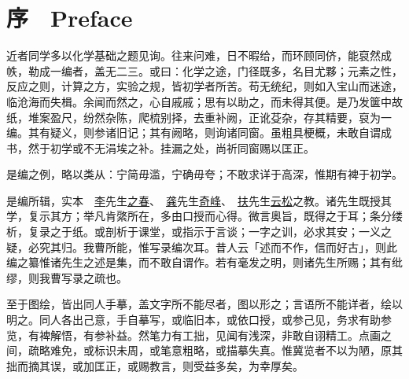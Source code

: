 
\chapter*{序　Preface}

\begingroup
    \renewcommand{\numberline}[1]{}   %
\endgroup

\thispagestyle{plain}   %

近者同学多以化学基础之题见询。往来问难，日不暇给，而环顾同侪，能裒然成帙，勒成一编者，盖无二三。或曰：化学之途，门径既多，名目尤夥；元素之性，反应之则，计算之方，实验之规，皆初学者所苦。苟无统纪，则如入宝山而迷途，临沧海而失楫。余闻而然之，心自戚戚；思有以助之，而未得其便。是乃发箧中故纸，堆案盈尺，纷然杂陈，爬梳别择，去重补阙，正讹芟杂，存其精要，裒为一编。其有疑义，则参诸旧记；其有阙略，则询诸同窗。虽粗具梗概，未敢自谓成书，然于初学或不无涓埃之补。挂漏之处，尚祈同窗赐以匡正。

是编之例，略以类从：宁简毋滥，宁确毋夸；不敢求详于高深，惟期有裨于初学。

是编所辑，实本　\uline{李}先生\uline{之春}、　\uline{龚}先生\uline{奇峰}、　\uline{扶}先生\uline{云松}之教。诸先生既授其学，复示其方；举凡肯綮所在，多由口授而心得。微言奥旨，既得之于耳；条分缕析，复录之于纸。或剖析于课堂，或指示于言谈；一字之训，必求其安；一义之疑，必究其归。我曹所能，惟写录编次耳。昔人云「述而不作，信而好古」，则此编之纂惟诸先生之述是集，而不敢自谓作。若有毫发之明，则诸先生所赐；其有纰缪，则我曹写录之疏也。

至于图绘，皆出同人手摹，盖文字所不能尽者，图以形之；言语所不能详者，绘以明之。同人各出己意，手自摹写，或临旧本，或依口授，或参己见，务求有助参览，有裨解悟，有参补益。然笔力有工拙，见闻有浅深，非敢自诩精工。点画之间，疏略难免，或标识未周，或笔意粗略，或描摹失真。惟冀览者不以为陋，原其拙而摘其误，或加匡正，或赐教言，则受益多矣，为幸厚矣。

